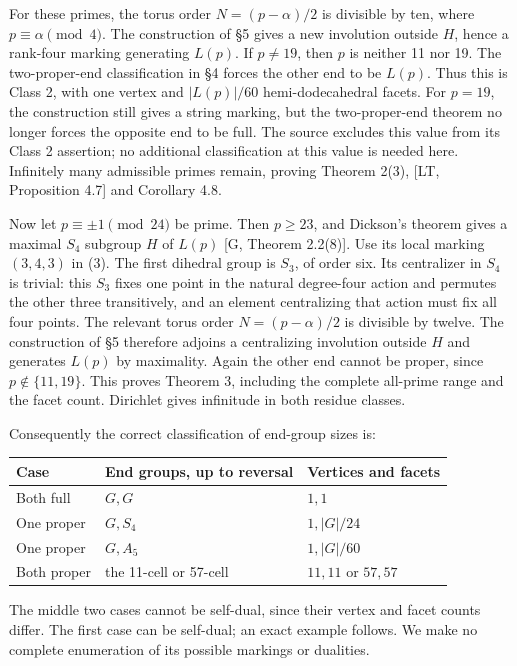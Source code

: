 \documentclass[
  11pt,
]{article}
\newcounter{none} %
\begin{document}
For these primes, the torus order \(N=(p-\alpha)/2\) is divisible by
ten, where \(p\equiv\alpha\pmod4\). The construction of §5 gives a new
involution outside \(H\), hence a rank-four marking generating \(L(p)\).
If \(p\ne19\), then \(p\) is neither 11 nor 19. The two-proper-end
classification in §4 forces the other end to be \(L(p)\). Thus this is
Class 2, with one vertex and \(|L(p)|/60\) hemi-dodecahedral facets. For
\(p=19\), the construction still gives a string marking, but the
two-proper-end theorem no longer forces the opposite end to be full. The
source excludes this value from its Class 2 assertion; no additional
classification at this value is needed here. Infinitely many admissible
primes remain, proving Theorem 2(3), {[}LT, Proposition 4.7{]} and
Corollary 4.8.

Now let \(p\equiv\pm1\pmod{24}\) be prime. Then \(p\ge23\), and
Dickson's theorem gives a maximal \(S_4\) subgroup \(H\) of \(L(p)\)
{[}G, Theorem 2.2(8){]}. Use its local marking \((3,4,3)\) in (3). The
first dihedral group is \(S_3\), of order six. Its centralizer in
\(S_4\) is trivial: this \(S_3\) fixes one point in the natural
degree-four action and permutes the other three transitively, and an
element centralizing that action must fix all four points. The relevant
torus order \(N=(p-\alpha)/2\) is divisible by twelve. The construction
of §5 therefore adjoins a centralizing involution outside \(H\) and
generates \(L(p)\) by maximality. Again the other end cannot be proper,
since \(p\notin\{11,19\}\). This proves Theorem 3, including the
complete all-prime range and the facet count. Dirichlet gives infinitude
in both residue classes.

Consequently the correct classification of end-group sizes is:

{\def\LTcaptype{none} %
\begin{longtable}[]{@{}lll@{}}
\toprule\noalign{}
Case & End groups, up to reversal & Vertices and facets \\
\midrule\noalign{}
\endhead
\bottomrule\noalign{}
\endlastfoot
Both full & \(G,G\) & \(1,1\) \\
One proper & \(G,S_4\) & \(1,|G|/24\) \\
One proper & \(G,A_5\) & \(1,|G|/60\) \\
Both proper & the 11-cell or 57-cell & \(11,11\) or \(57,57\) \\
\end{longtable}
}

The middle two cases cannot be self-dual, since their vertex and facet
counts differ. The first case can be self-dual; an exact example
follows. We make no complete enumeration of its possible markings or
dualities.
\end{document}
